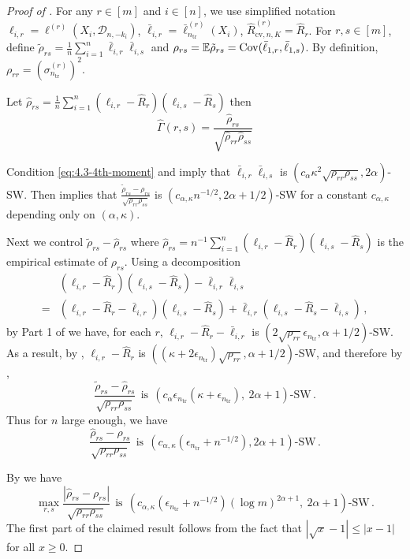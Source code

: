 \documentclass[11pt]{article}
\theoremstyle{plain}
\newcommand{\cv}{{\mathrm{cv}}}
\newcommand{\tr}{{\mathrm{tr}}}
\newcommand{\D}{{\mathcal{D}}}
\begin{document}
\begin{proof}
    [Proof of ]
    For any $r\in[m]$ and $i\in[n]$, we use simplified notation
$\ell_{i,r}=\ell^{(r)}(X_i,\D_{n,-k_i})$, $\bar\ell_{i,r}=\bar\ell_{n_\tr}^{(r)}(X_i)$, $\hat R_{\cv,n,K}^{(r)}=\hat R_r$.
For $r,s\in[m]$, define
$\tilde \rho_{rs} = \frac{1}{n}\sum_{i=1}^n \bar\ell_{i,r}\bar\ell_{i,s}$
and $\rho_{rs} = \mathbb E \tilde \rho_{rs} = {\rm Cov}(\bar\ell_{1,r},\bar\ell_{1,s})$.  By definition, $\rho_{rr}=(\sigma_{n_\tr}^{(r)})^2$.

Let $\hat\rho_{rs}=\frac{1}{n}\sum_{i=1}^n(\ell_{i,r}-\hat R_r)(\ell_{i,s}-\hat R_s)$ then
$$
\hat\Gamma(r,s) = \frac{\hat\rho_{rs}}{\sqrt{\hat\rho_{rr}\hat\rho_{ss}}}
$$

Condition \eqref{eq:4.3-4th-moment} and  imply that $\bar\ell_{i,r}\bar\ell_{i,s}$ is $(c_\alpha \kappa^2 \sqrt{\rho_{rr}\rho_{ss}},2\alpha)$-SW.
Then  implies that 
$\frac{\tilde\rho_{rs}-\rho_{rs}}{\sqrt{\rho_{rr}\rho_{ss}}}$ is $(c_{\alpha,\kappa} n^{-1/2},2\alpha+1/2)$-SW for a constant $c_{\alpha,\kappa}$ depending only on $(\alpha,\kappa)$.

    Next we control $\tilde\rho_{rs}-\hat\rho_{rs}$ where $\hat\rho_{rs}=n^{-1}\sum_{i=1}^n(\ell_{i,r}-\hat R_r)(\ell_{i,s}-\hat R_s)$ is the empirical estimate of $\rho_{rs}$.  Using a decomposition
\begin{align*}
&(\ell_{i,r}-\hat R_r)(\ell_{i,s}-\hat R_s)-\bar\ell_{i,r}\bar\ell_{i,s}\\
=&(\ell_{i,r}-\hat R_r-\bar\ell_{i,r})(\ell_{i,s}-\hat R_s)+\bar\ell_{i,r}(\ell_{i,s}-\hat R_s-\bar\ell_{i,s})\,,
\end{align*}
by Part 1 of  we have, for each $r$,
 $\ell_{i,r}-\hat R_r-\bar\ell_{i,r}$ is $(2\sqrt{\rho_{rr}}\epsilon_{n_\tr},\alpha+1/2)$-SW.
As a result, by ,
$\ell_{i,r}-\hat R_r$ is $((\kappa+2\epsilon_{n_\tr})\sqrt{\rho_{rr}},\alpha+1/2)$-SW, and
therefore by ,
$$
\frac{\tilde\rho_{rs}-\hat\rho_{rs}}{\sqrt{\rho_{rr}\rho_{ss}}}~~
\text{is}~~(c_\alpha \epsilon_{n_\tr}(\kappa+\epsilon_{n_\tr}),~2\alpha+1)\text{-SW}\,.
$$
Thus for $n$ large enough, we have
$$
\frac{\hat\rho_{rs}-\rho_{rs}}{\sqrt{\rho_{rr}\rho_{ss}}}~~\text{is}~~(c_{\alpha,\kappa}(\epsilon_{n_\tr}+n^{-1/2}),2\alpha+1)\text{-SW}\,.
$$

By  we have
\begin{equation}\label{eq:4.4-cov-est-err-sw}
\max_{r,s}\frac{|\hat\rho_{rs}-\rho_{rs}|}{\sqrt{\rho_{rr}\rho_{ss}}}~~\text{is}~~(c_{\alpha,\kappa}(\epsilon_{n_\tr}+n^{-1/2})(\log m)^{2\alpha+1},~2\alpha+1)\text{-SW}\,.
\end{equation}
The first part of the claimed result follows from the fact that $|\sqrt{x}-1|\le |x-1|$ for all $x\ge 0$.



\end{proof}
\end{document}
